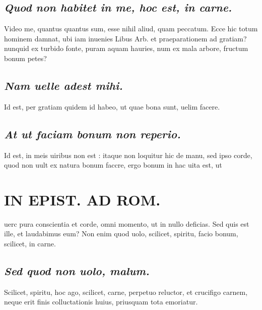 \documentclass{article}
\begin{document}
\begin{pages}
\subsection*{\textit{Quod non habitet in me, hoc est, in carne. }}\pstart Video me, quantus quantus sum, esse nihil aliud, quam peccatum. Ecce hic totum hominem damnat, ubi iam inuenies Libus Arb. et praeparationem ad gratiam? nunquid ex turbido fonte, puram aquam hauries, num ex mala arbore, fructum bonum petes?  \pend
{}
{}
\subsection*{\textit{Nam uelle adest mihi. }}\pstart Id est, per gratiam quidem id habeo, ut quae bona sunt, uelim facere.   \pend
{}
{}
\subsection*{\textit{At ut faciam bonum non reperio. }}\pstart Id est, in meis uiribus non est : itaque non loquitur hic de manu, sed ipso corde, quod non uult ex natura bonum faccre, ergo bonum in hac uita est, ut\pend
\section*{IN EPIST. AD ROM.   }
\marginpar{[ p.]}\pstart uerc pura conscientia et corde, omni momento, ut in nullo deficias. Sed quis est ille, et laudabimus eum? Non enim quod uolo, scilicet, spiritu, facio bonum, scilicet, in carne.   \pend
{}
{}
\subsection*{\textit{Sed quod non uolo, malum. }}\pstart Scilicet, spiritu, hoc ago, scilicet, carne, perpetuo reluctor, et crucifigo carnem, neque erit finis colluctationis huius, priusquam tota emoriatur.   \pend
{}
{}

\end{pages}
\end{document}
